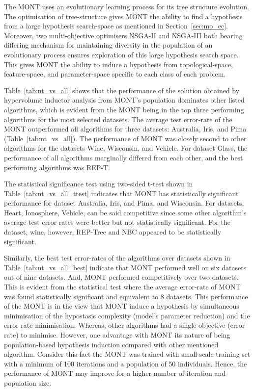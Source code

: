 \documentclass[conference]{IEEEtran}
\begin{document}
\begin{table*}
The MONT uses an evolutionary learning process for its tree structure evolution. The optimisation of tree-structure gives MONT the ability to find a hypothesis from a large hypothesis search-space as mentioned in Section~\ref{sec:mo_ec}. Moreover, two multi-objective optimisers NSGA-II and NSGA-III both bearing differing mechanism for maintaining diversity in the population of an evolutionary process ensures exploration of this large hypothesis search space. This gives MONT the ability to induce a hypothesis from topological-space, feature-space, and parameter-space specific to each class of each problem.

Table~\ref{tab:nt_vs_all} shows that the performance of the solution obtained by hypervolume inductor analysis from MONT's population dominates other listed algorithms, which is evident from the MONT being in the top three performing algorithms for the most selected datasets. The average test error-rate of the MONT outperformed all algorithms for three datasets: Australia, Iris, and Pima (Table~\ref{tab:nt_vs_all}). The performance of MONT was closely second to other algorithms for the datasets Wine, Wisconsin, and Vehicle. For dataset Glass, the performance of all algorithms marginally differed from each other, and the best performing algorithms was REP-T. 

The statistical significance test using two-sided t-test shown in Table~\ref{tab:nt_vs_all_ttest} indicates that MONT has statistically significant performance for dataset Australia, Iris, and Pima, and Wisconsin. For datasets, Heart, Ionosphere, Vehicle, can be said competitive since some other algorithm's average test error rates were better but not statistically significant. For the dataset, wine, however, REP-Tree and NBC appeared to be statistically significant.  

Similarly, the best test error-rates of the algorithms over datasets shown in Table~\ref{tab:nt_vs_all_best} indicate that MONT performed well on six datasets out of nine datasets. And, MONT performed competitively over two datasets. This is evident from the statistical test where the average error-rate of MONT was found statistically significant and equivalent to 8 datasets. This performance of the MONT is in the view that MONT induce a hypothesis by simultaneous minimisation of the hypostasis complexity (model's parameter reduction)  and the error rate minimisation.  Whereas, other algorithms had a single objective (error rate) to minimise. However, one advantage with MONT its nature of being population-based hypothesis induction compared with other mentioned algorithm. Consider this fact the MONT was trained with small-scale training set with a minimum of 100 iterations and a population of 50 individuals. Hence, the performance of MONT may improve for a higher number of iteration and population size.  



\end{table*}
\end{document}

